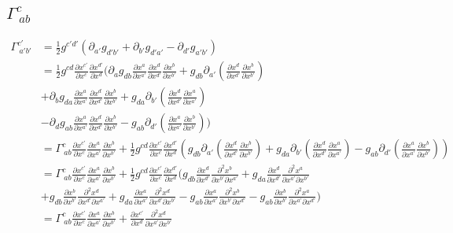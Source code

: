 \documentclass{article}
\begin{document}
\subsection{$\Gamma^{c}_{~ab}$}
\begin{align*}
\Gamma^{c'}_{~a'b'} & = \frac{1}{2}g^{c'd'}(\partial_{a'}g_{d'b'} + \partial_{b'}g_{d'a'} - \partial_{d'}g_{a'b'})\\
& = \frac{1}{2}g^{cd}\frac{\partial x^{c'}}{\partial x^{c}}\frac{\partial x^{d'}}{\partial x^{d}}(\partial_{a}g_{db}\frac{\partial x^{a}}{\partial x^{a'}}\frac{\partial x^{d}}{\partial x^{d'}}\frac{\partial x^{b}}{\partial x^{b'}} + g_{db}\partial_{a'}(\frac{\partial x^{d}}{\partial x^{d'}}\frac{\partial x^{b}}{\partial x^{b'}})\\
&+ \partial_{b}g_{da}\frac{\partial x^{a}}{\partial x^{a'}}\frac{\partial x^{d}}{\partial x^{d'}}\frac{\partial x^{b}}{\partial x^{b'}} + g_{da}\partial_{b'}(\frac{\partial x^{d}}{\partial x^{d'}}\frac{\partial x^{a}}{\partial x^{a'}})\\
&- \partial_{d}g_{ab}\frac{\partial x^{a}}{\partial x^{a'}}\frac{\partial x^{d}}{\partial x^{d'}}\frac{\partial x^{b}}{\partial x^{b'}} - g_{ab}\partial_{d'}(\frac{\partial x^{a}}{\partial x^{a'}}\frac{\partial x^{b}}{\partial x^{b'}}))\\
& = \Gamma^{c}_{~ab}\frac{\partial x^{c'}}{\partial x^{c}}\frac{\partial x^{a}}{\partial x^{a'}}\frac{\partial x^{b}}{\partial x^{b'}} + \frac{1}{2}g^{cd}\frac{\partial x^{c'}}{\partial x^{c}}\frac{\partial x^{d'}}{\partial x^{d}}(g_{db}\partial_{a'}(\frac{\partial x^{d}}{\partial x^{d'}}\frac{\partial x^{b}}{\partial x^{b'}}) + g_{da}\partial_{b'}(\frac{\partial x^{d}}{\partial x^{d'}}\frac{\partial x^{a}}{\partial x^{a'}}) -  g_{ab}\partial_{d'}(\frac{\partial x^{a}}{\partial x^{a'}}\frac{\partial x^{b}}{\partial x^{b'}}))\\
& = \Gamma^{c}_{~ab}\frac{\partial x^{c'}}{\partial x^{c}}\frac{\partial x^{a}}{\partial x^{a'}}\frac{\partial x^{b}}{\partial x^{b'}} + \frac{1}{2}g^{cd}\frac{\partial x^{c'}}{\partial x^{c}}\frac{\partial x^{d'}}{\partial x^{d}}(g_{db}\frac{\partial x^{d}}{\partial x^{d'}}\frac{\partial^2 x^{b}}{\partial x^{b'}\partial x^{a'}} + g_{da}\frac{\partial x^{d}}{\partial x^{d'}}\frac{\partial^2 x^{a}}{\partial x^{a'}\partial x^{b'}} \\
& + g_{db}\frac{\partial x^{b}}{\partial x^{b'}}\frac{\partial^2 x^{d}}{\partial x^{d'}\partial x^{a'}} + g_{da}\frac{\partial x^{a}}{\partial x^{a'}}\frac{\partial^2 x^{d}}{\partial x^{d'}\partial x^{b'}} - g_{ab}\frac{\partial x^{a}}{\partial x^{a'}}\frac{\partial^2 x^{b}}{\partial x^{b'}\partial x^{d'}} - g_{ab}\frac{\partial x^{b}}{\partial x^{b'}}\frac{\partial^2 x^{a}}{\partial x^{a'}\partial x^{d'}})\\
& = \Gamma^{c}_{~ab}\frac{\partial x^{c'}}{\partial x^{c}}\frac{\partial x^{a}}{\partial x^{a'}}\frac{\partial x^{b}}{\partial x^{b'}} + \frac{\partial x^{c'}}{\partial x^{d}}\frac{\partial^2 x^{d}}{\partial x^{a'}\partial x^{b'}}
\end{align*}
\end{document}
